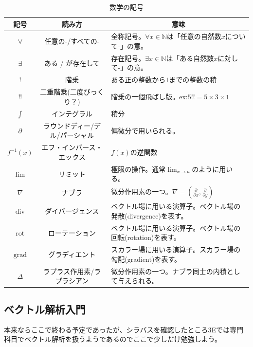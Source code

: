 \documentclass[a4j,dvipdfmx]{jsarticle}
\begin{document}
\begin{table}[h]
                    \caption*{数学の記号}
                    \centering
                    \begin{tabular}{|c|c|l|}\hline
                        記号 & 読み方 & \multicolumn{1}{c|}{意味}\\\hline
                        $\forall$ & 任意の-/すべての- & 全称記号。$\forall x \in \mathbb{N}$は「任意の自然数$x$について-」の意。\\\hline
                        $\exists$ & ある-/-が存在して & 存在記号。$\exists x \in \mathbb{N}$は「ある自然数$x$に対して-」の意。 \\\hline
                        $!$ & 階乗 & ある正の整数から$1$までの整数の積\\\hline
                        $!!$ & 二重階乗(二度びっくり？) & 階乗の一個飛ばし版。ex:\hspace{1mm}$5!!=5\times3\times1$\\\hline
                        $\int$ & インテグラル & 積分 \\\hline
                        $\partial$ & ラウンドディー/デル/パーシャル & 偏微分で用いられる。\\\hline
                        $f^{-1}(x)$ & エフ・インバース・エックス & $f(x)$の逆関数\\\hline
                        $\lim$ & リミット & 極限の操作。通常$\displaystyle\lim_{x\to a}$のように用いる。\\\hline
                        $\nabla$ & ナブラ & 微分作用素の一つ。$\nabla=\left(\frac{\partial}{\partial x},\frac{\partial}{\partial y}\right)$\\\hline
                        $\mathrm{div}$ & ダイバージェンス & ベクトル場に用いる演算子。ベクトル場の発散(divergence)を表す。\\\hline
                        $\mathrm{rot}$ & ローテーション & ベクトル場に用いる演算子。ベクトル場の回転(rotation)を表す。\\\hline
                        $\mathrm{grad}$ & グラディエント & スカラー場に用いる演算子。スカラー場の勾配(gradient)を表す。\\\hline
                        $\varDelta$ & ラプラス作用素/ラプラシアン & 微分作用素の一つ。ナブラ同士の内積として与えられる。\\\hline
                    \end{tabular}
                \end{table}
        \clearpage
        \subsection{ベクトル解析入門}
            本来ならここで終わる予定であったが、シラバスを確認したところ3Eでは専門科目でベクトル解析を扱うようであるのでここで少しだけ勉強しよう。\\
\end{document}
